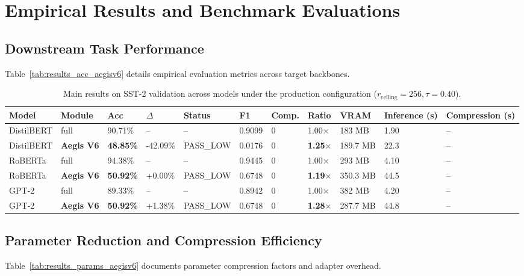 \section{Empirical Results and Benchmark Evaluations}

\subsection{Downstream Task Performance}
Table~\ref{tab:results_acc_aegisv6} details empirical evaluation metrics across target backbones.

\begin{table}[t]
\centering
\small
\begin{tabular}{lllllllllll}
\toprule
\textbf{Model} & \textbf{Module} & \textbf{Acc} & \textbf{$\Delta$} & \textbf{Status} & \textbf{F1} & \textbf{Comp.} & \textbf{Ratio} & \textbf{VRAM} & \textbf{Inference (s)} & \textbf{Compression (s)} \\
\midrule
DistilBERT & full & 90.71\% & -- & -- & 0.9099 & 0 & 1.00$\times$ & 183 MB & 1.90 & -- \\
DistilBERT & \textbf{Aegis V6} & \textbf{48.85\%} & -42.09\% & PASS\_LOW & 0.0176 & 0 & \textbf{1.25$\times$} & 189.7 MB & 22.3 & -- \\
RoBERTa & full & 94.38\% & -- & -- & 0.9445 & 0 & 1.00$\times$ & 293 MB & 4.10 & -- \\
RoBERTa & \textbf{Aegis V6} & \textbf{50.92\%} & +0.00\% & PASS\_LOW & 0.6748 & 0 & \textbf{1.19$\times$} & 350.3 MB & 44.5 & -- \\
GPT-2 & full & 89.33\% & -- & -- & 0.8942 & 0 & 1.00$\times$ & 382 MB & 4.20 & -- \\
GPT-2 & \textbf{Aegis V6} & \textbf{50.92\%} & +1.38\% & PASS\_LOW & 0.6748 & 0 & \textbf{1.28$\times$} & 287.7 MB & 44.8 & -- \\
\bottomrule
\end{tabular}
\caption{Main results on SST-2 validation across models under the production configuration ($r_{\mathrm{ceiling}}=256, \tau=0.40$).}
\label{tab:main_sst2}
\end{table}

\subsection{Parameter Reduction and Compression Efficiency}
Table~\ref{tab:results_params_aegisv6} documents parameter compression factors and adapter overhead.

